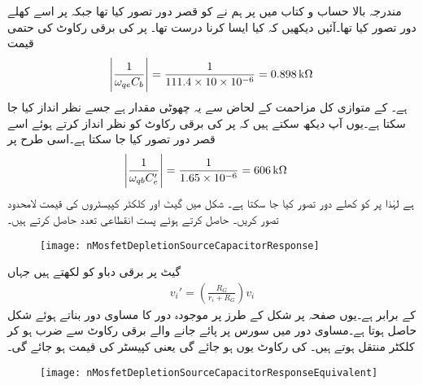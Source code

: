 مندرجہ بالا حساب و کتاب میں  پر ہم نے  کو قصر دور تصور کیا تھا جبکہ  پر اسے کھلے دور تصور کیا تھا۔آئیں دیکھیں کہ کیا ایسا کرنا درست تھا۔ پر  کی برقی رکاوٹ کی حتمی قیمت
\begin{align*}
\abs{\frac{1}{\omega_{qe} C_b}}&=\frac{1}{111.4 \times 10 \times 10^{-6}}=\SI{0.898}{\kilo \ohm}\\
\end{align*}
ہے۔ کے متوازی کل مزاحمت کے لحاض سے یہ چھوٹی مقدار ہے جسے نظر انداز کیا جا سکتا ہے۔یوں آپ دیکھ سکتے ہیں کہ  پر  کی برقی رکاوٹ کو نظر انداز کرتے ہوئے اسے قصر دور تصور کیا جا سکتا ہے۔اسی طرح  پر
\begin{align*}
\abs{\frac{1}{\omega_{qb} C_e'}}&=\frac{1}{1.65 \times 10^{-6}}=\SI{606}{\kilo \ohm}
\end{align*}
ہے لہٰذا  پر  کو کھلے دور تصور کیا جا سکتا ہے۔
شکل  میں گیٹ اور کلکٹر  کپیسٹروں کی قیمت لامحدود تصور کریں۔ حاصل کرتے ہوئے پست انقطاعی تعدد  حاصل کرتے ہیں۔
\begin{figure}
\centering
\texttt{[image: nMosfetDepletionSourceCapacitorResponse]}
\caption{}
\label{شکل_تعددی_ردعمل_مثال_ماسفیٹ_مخارج_کپیسٹر}
\end{figure}
گیٹ پر برقی دباو کو  لکھتے ہیں جہاں
\begin{align*}
v_i'=\left(\frac{R_G}{r_i+R_G} \right) v_i
\end{align*}
کے برابر ہے۔یوں صفحہ  پر شکل  کے طرز پر موجودہ دور کا مساوی دور بناتے ہوئے شکل  حاصل ہوتا ہے۔مساوی دور میں سورس پر پائے جانے والے برقی رکاوٹ
  سے ضرب ہو کر کلکٹر  منتقل ہوتے ہیں۔ کی رکاوٹ  یوں
  ہو جائے گی یعنی کپیسٹر کی قیمت  ہو جائے گی۔
\begin{figure}
\centering
\texttt{[image: nMosfetDepletionSourceCapacitorResponseEquivalent]}
\caption{}
\label{شکل_تعددی_ردعمل_مثال_مخارج_کپیسٹر_مساوی}
\end{figure}

